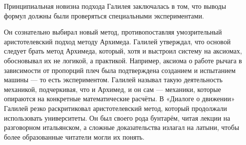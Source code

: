 




Принципиальная новизна подхода Галилея заключалась в том, что выводы формул должны были проверяться специальными экспериментами.

Он сознательно выбирал новый метод, противопоставляя умозрительный аристотелевский подход методу Архимеда. Галилей утверждал, что основой следует брать метод Архимеда, который, хотя и выстроил систему на аксиомах, обосновывал их не логикой, а практикой. Например, аксиома о работе рычага в зависимости от пропорций плеч была подтверждена созданием и испытанием машины --- то есть экспериментом. Галилей называл такую деятельность механикой, подчеркивая, что и Архимед, и он сам --- механики, которые опираются на конкретные математические расчёты.
В «Диалоге о движении» Галилей резко раскритиковал аристотелевский метод, который продолжали использовать университеты. Он был своего рода бунтарём, читая лекции на разговорном итальянском, а сложные доказательства излагал на латыни, чтобы более образованные читатели могли их понять.

